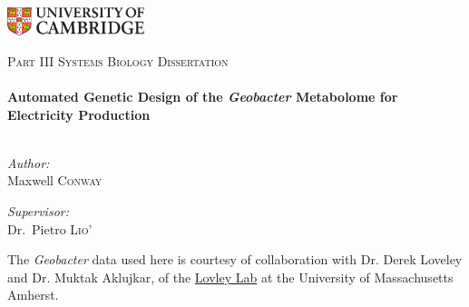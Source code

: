 
\begin{titlepage}
\begin{center}

\begin{flushleft}
\includegraphics[width=0.3\textwidth]{./logo}~\\[1cm]
\end{flushleft}

\textsc{\Large Part III Systems Biology Dissertation}\\[0.5cm]

\HRule \\[0.4cm]
{ \huge \bfseries Automated Genetic Design of the \textit{Geobacter} Metabolome for Electricity Production}\\[0.4cm]

\HRule \\[1.5cm]

\begin{minipage}{0.4\textwidth}
\begin{flushleft} \large
\emph{Author:}\\
Maxwell \textsc{Conway}
\end{flushleft}
\end{minipage}
\begin{minipage}{0.4\textwidth}
\begin{flushright} \large
\emph{Supervisor:} \\
Dr.~Pietro \textsc{Lio'}
\end{flushright}
\end{minipage}
\vspace{1cm}

The \textit{Geobacter} data used here is courtesy of collaboration with Dr. Derek Loveley and Dr. Muktak Aklujkar, of the \href{http://www.geobacter.org/}{Lovley Lab} at the University of Massachusetts Amherst.
\vspace{1cm}

\begin{abstract}

\end{abstract}

\end{center}
\end{titlepage}
